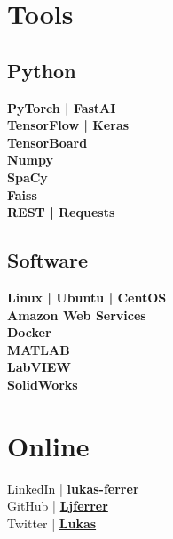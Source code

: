 \documentclass[letterpaper]{deedy-resume} %
\begin{document}
\begin{minipage}[t]{0.33\textwidth}
\sectionspace %


\section{Tools}

\subsection{Python}
{\bf PyTorch | FastAI} \\
{\bf TensorFlow | Keras} \\
{\bf TensorBoard} \\ 
{\bf Numpy} \\ 
{\bf SpaCy} \\ 
{\bf Faiss} \\ 
{\bf REST | Requests} \\

\sectionspace %

\subsection{Software}
{\bf Linux | Ubuntu | CentOS} \\
{\bf Amazon Web Services} \\
{\bf Docker} \\
{\bf MATLAB} \\
{\bf LabVIEW} \\
{\bf SolidWorks} \\

\sectionspace %


\section{Online} 
\location{}     %
{LinkedIn | \href{https://www.linkedin.com/in/lukas-ferrer-9596a410b}{\bf lukas-ferrer}} \\
{GitHub | \href{https://github.com/Ljferrer}{\bf Ljferrer}} \\
{Twitter | \href{https://twitter.com/YungGraceHopper}{\bf Lukas}}

\sectionspace %


\end{minipage} %
\end{document}
